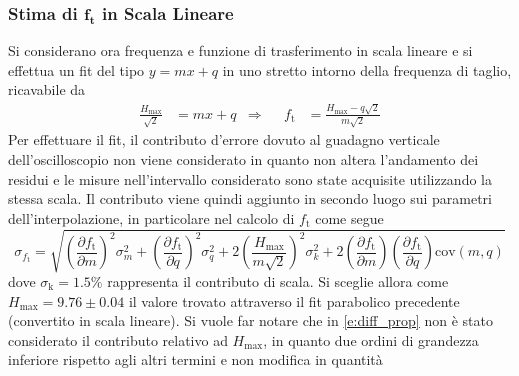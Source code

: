 \documentclass[a4paper,11pt]{article} %
\begin{document}

\subsubsection{Stima di $\mathbf{f_{\text{t}}}$ in Scala Lineare}

Si considerano ora frequenza e funzione di trasferimento in scala lineare e si effettua un fit del tipo $y = mx + q$ in
uno stretto intorno della frequenza di taglio, ricavabile da
\begin{align}
	\frac{H_{\text{max}}}{\sqrt{2}}&=mx+q & \Longrightarrow & & f_{\text{t}}&=\frac{H_{\text{max}}-q\sqrt{2}}{m\sqrt{2}}
\end{align}
\noindent Per effettuare il fit, il contributo d'errore dovuto al guadagno verticale dell'oscilloscopio non viene
considerato in quanto non altera l'andamento dei residui e le misure nell'intervallo considerato sono state acquisite
utilizzando la stessa scala. Il contributo viene quindi aggiunto in secondo luogo sui parametri dell’interpolazione, in
particolare nel calcolo di $f_{\text{t}}$ come segue
\begin{equation}\label{e:diff_prop}
	\sigma_{f_{\text{t}}}=\sqrt{
		\left(
			\frac{\partial f_{\text{t}}}{\partial m}
		\right)^2\sigma_m^2+
		\left(
			\frac{\partial f_{\text{t}}}{\partial q}
		\right)^2\sigma_q^2+
		2\left(
			\frac{H_{\text{max}}}{m\sqrt{2}}
		\right)^2\sigma_k^2+
		2\left(
			\frac{\partial f_{\text{t}}}{\partial m}
		\right)
		\left(
			\frac{\partial f_{\text{t}}}{\partial q}
		\right)\text{cov}(m,q)
	}
\end{equation}
\noindent dove $\sigma_{\text{k}}=1.5\%$ rappresenta il contributo di scala. Si sceglie allora come
$H_{\text{max}} = 9.76 \pm 0.04$ il valore trovato attraverso il fit parabolico precedente (convertito in scala
lineare). Si vuole far notare che in \autoref{e:diff_prop} non è stato considerato il contributo relativo ad
$H_{\text{max}}$, in quanto due ordini di grandezza inferiore rispetto agli altri termini e non modifica in quantità
\end{document}
